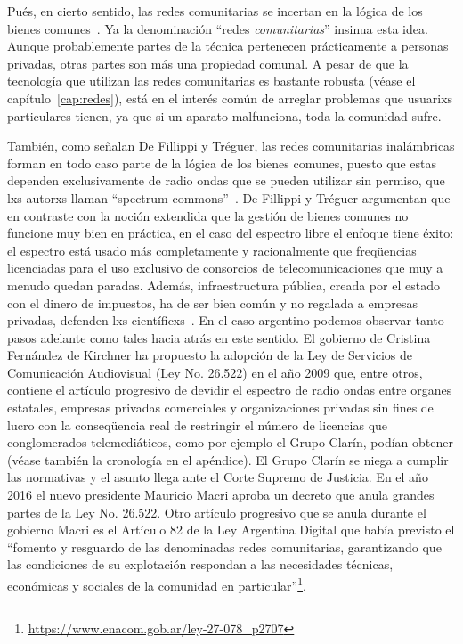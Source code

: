 Pués, en cierto sentido, las redes comunitarias se incertan en la lógica de los bienes comunes~\autocite{FiTre2015}.
Ya la denominación ``redes \textit{comunitarias}'' insinua esta idea.
Aunque probablemente partes de la técnica pertenecen prácticamente a personas privadas, otras partes son más una propiedad comunal.
A pesar de que la tecnología que utilizan las redes comunitarias es bastante robusta (véase el capítulo~\vref{cap:redes}), está en el interés común de arreglar problemas que usuarixs particulares tienen, ya que si un aparato malfunciona, toda la comunidad sufre.

También, como señalan De Fillippi y Tréguer, las redes comunitarias inalámbricas forman en todo caso parte de la lógica de los bienes comunes, puesto que estas dependen exclusivamente de radio ondas que se pueden utilizar sin permiso, que lxs autorxs llaman ``spectrum commons''~\autocite{FiTre2015}.
De Fillippi y Tréguer argumentan que en contraste con la noción extendida que la gestión de bienes comunes no funcione muy bien en práctica, en el caso del espectro libre el enfoque tiene éxito:
el espectro está usado más completamente y racionalmente que freqüencias licenciadas para el uso exclusivo de consorcios de telecomunicaciones que muy a menudo quedan paradas.
Además, infraestructura pública, creada por el estado con el dinero de impuestos, ha de ser bien común y no regalada a empresas privadas, defenden lxs científicxs~\autocite{FiTre2015}.
En el caso argentino podemos observar tanto pasos adelante como tales hacia atrás en este sentido.
El gobierno de Cristina Fernández de Kirchner ha propuesto la adopción de la Ley de Servicios de Comunicación Audiovisual (Ley No. 26.522) en el año 2009 que, entre otros, contiene el artículo progresivo de devidir el espectro de radio ondas entre organes estatales, empresas privadas comerciales y organizaciones privadas sin fines de lucro con la conseqüencia real de restringir el número de licencias que conglomerados telemediáticos, como por ejemplo el Grupo Clarín, podían obtener (véase también la cronología en el apéndice).
El Grupo Clarín se niega a cumplir las normativas y el asunto llega ante el Corte Supremo de Justicia.
En el año 2016 el nuevo presidente Mauricio Macri aproba un decreto que anula grandes partes de la Ley No. 26.522.
Otro artículo progresivo que se anula durante el gobierno Macri es el Artículo 82 de la Ley Argentina Digital que había previsto el ``fomento y resguardo de las denominadas redes comunitarias, garantizando que las condiciones de su explotación respondan a las necesidades técnicas, económicas y sociales de la comunidad en particular''\footnote{\url{https://www.enacom.gob.ar/ley-27-078_p2707}}.

